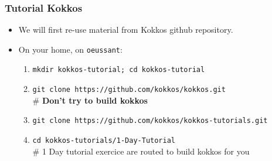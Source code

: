 \begin{frame}
  \frametitle{Tutorial Kokkos}

  \begin{itemize}
  \item We will first re-use material from Kokkos github repository.
  \item On your home, on \texttt{oeussant}: 
    \begin{enumerate}
    \item \texttt{mkdir kokkos-tutorial; cd kokkos-tutorial}
    \item \texttt{git clone https://github.com/kokkos/kokkos.git} \\
      \# \textbf{Don't try to build kokkos}
    \item \texttt{git clone https://github.com/kokkos/kokkos-tutorials.git}
    \item \texttt{cd kokkos-tutorials/1-Day-Tutorial}\\
      \# 1 Day tutorial exercice are routed to build kokkos for you
    \end{enumerate}
  \end{itemize}

\end{frame}

